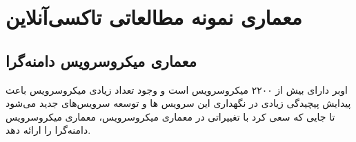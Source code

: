 \chapter{معماری نمونه مطالعاتی تاکسی‌آنلاین }
\section{معماری میکرو‌سرویس دامنه‌گرا}
اوبر  دارای بیش از ۲۲۰۰ میکرو‌سرویس است\cite{microservice_uber} و وجود تعداد زیادی میکرو‌سرویس باعث پیدایش پیچیدگی زیادی در نگهداری این سرویس ها و توسعه سرویس‌های جدید می‌شود تا جایی که  سعی کرد با تغییراتی در معماری میکرو‌سرویس، معماری میکروسرویس دامنه‌گرا را ارائه دهد.